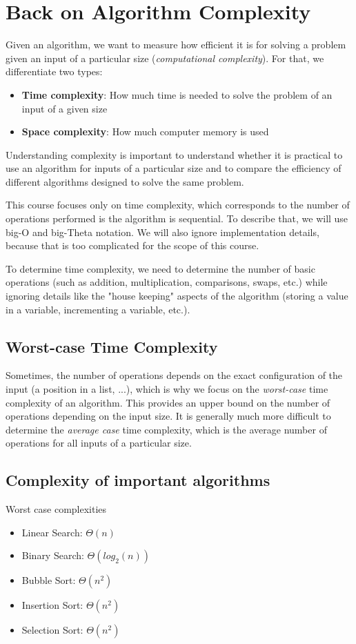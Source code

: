 \documentclass[10pt,a4paper]{book}
\begin{document}
\section{Back on Algorithm Complexity}
Given an algorithm, we want to measure how efficient it is for solving a problem given an input of a particular size (\textit{computational complexity}). For that, we differentiate two types:
\begin{itemize}
\item \textbf{Time complexity}: How much time is needed to solve the problem of an input of a given size
\item \textbf{Space complexity}: How much computer memory is used
\end{itemize}
Understanding complexity is important to understand whether it is practical to use an algorithm for inputs of a particular size and to compare the efficiency of different algorithms designed to solve the same problem.\par 
This course focuses only on time complexity, which corresponds to the number of operations performed is the algorithm is sequential. To describe that, we will use big-O and big-Theta notation. We will also ignore implementation details, because that is too complicated for the scope of this course.\par 
To determine time complexity, we need to determine the number of basic operations (such as addition, multiplication, comparisons, swaps, etc.) while ignoring details like the "house keeping" aspects of the algorithm (storing a value in a variable, incrementing a variable, etc.).\par 
\subsection{Worst-case Time Complexity}
Sometimes, the number of operations depends on the exact configuration of the input (a position in a list, ...), which is why we focus on the \textit{worst-case} time complexity of an algorithm. This provides an upper bound on the number of operations depending on the input size. It is generally much more difficult to determine the \textit{average case} time complexity, which is the average number of operations for all inputs of a particular size.
\subsection{Complexity of important algorithms}
Worst case complexities
\begin{itemize}
\item Linear Search: $\Theta (n)$
\item Binary Search: $\Theta (log_2(n))$
\item Bubble Sort: $\Theta (n^2)$
\item Insertion Sort: $\Theta (n^2)$
\item Selection Sort: $\Theta (n^2)$
\end{itemize}
\end{document}
